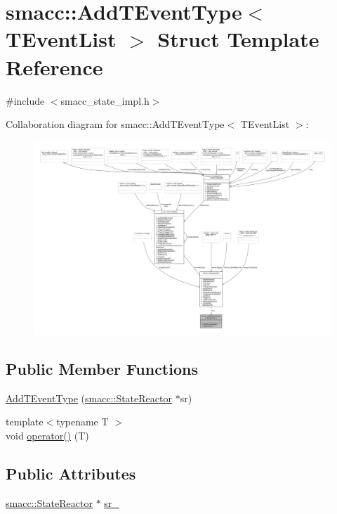 \hypertarget{structsmacc_1_1AddTEventType}{}\section{smacc\+:\+:Add\+T\+Event\+Type$<$ T\+Event\+List $>$ Struct Template Reference}
\label{structsmacc_1_1AddTEventType}


{\ttfamily \#include $<$smacc\+\_\+state\+\_\+impl.\+h$>$}



Collaboration diagram for smacc\+:\+:Add\+T\+Event\+Type$<$ T\+Event\+List $>$\+:
\nopagebreak
\begin{figure}[H]
\begin{center}
\leavevmode
\includegraphics[width=350pt]{structsmacc_1_1AddTEventType__coll__graph}
\end{center}
\end{figure}
\subsection*{Public Member Functions}
\begin{DoxyCompactItemize}
\item 
\hyperlink{structsmacc_1_1AddTEventType_a1e8794eb86eddc06d0078b49de67ae44}{Add\+T\+Event\+Type} (\hyperlink{classsmacc_1_1StateReactor}{smacc\+::\+State\+Reactor} $\ast$sr)
\item 
{\footnotesize template$<$typename T $>$ }\\void \hyperlink{structsmacc_1_1AddTEventType_ac642d67fbf347088d74dfec135df1e55}{operator()} (T)
\end{DoxyCompactItemize}
\subsection*{Public Attributes}
\begin{DoxyCompactItemize}
\item 
\hyperlink{classsmacc_1_1StateReactor}{smacc\+::\+State\+Reactor} $\ast$ \hyperlink{structsmacc_1_1AddTEventType_aba9d00c23aeaae6299708f031a9168ba}{sr\+\_\+}
\end{DoxyCompactItemize}


